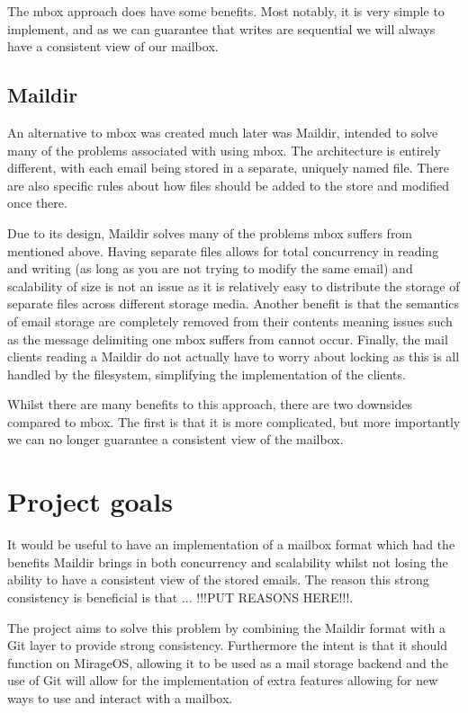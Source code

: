 \documentclass[12pt,a4paper,twoside,openright]{report}
\begin{document}
The mbox approach does have some benefits. Most notably, it is very simple to implement, and as we can guarantee that writes are sequential we will always have a consistent view of our mailbox.

\subsection{Maildir}

An alternative to mbox was created much later was Maildir, intended to solve many of the problems associated with using mbox. The architecture is entirely different, with each email being stored in a separate, uniquely named file. There are also specific rules about how files should be added to the store and modified once there.

Due to its design, Maildir solves many of the problems mbox suffers from mentioned above. Having separate files allows for total concurrency in reading and writing (as long as you are not trying to modify the same email) and scalability of size is not an issue as it is relatively easy to distribute the storage of separate files across different storage media. Another benefit is that the semantics of email storage are completely removed from their contents meaning issues such as the message delimiting one mbox suffers from cannot occur. Finally, the mail clients reading a Maildir do not actually have to worry about locking as this is all handled by the filesystem, simplifying the implementation of the clients.

Whilst there are many benefits to this approach, there are two downsides compared to mbox. The first is that it is more complicated, but more importantly we can no longer guarantee a consistent view of the mailbox.

\section{Project goals}

It would be useful to have an implementation of a mailbox format which had the benefits Maildir brings in both concurrency and scalability whilst not losing the ability to have a consistent view of the stored emails. The reason this strong consistency is beneficial is that ... !!!PUT REASONS HERE!!!.

The project aims to solve this problem by combining the Maildir format with a Git layer to provide strong consistency. Furthermore the intent is that it should function on MirageOS, allowing it to be used as a mail storage backend and the use of Git will allow for the implementation of extra features allowing for new ways to use and interact with a mailbox.
\end{document}
